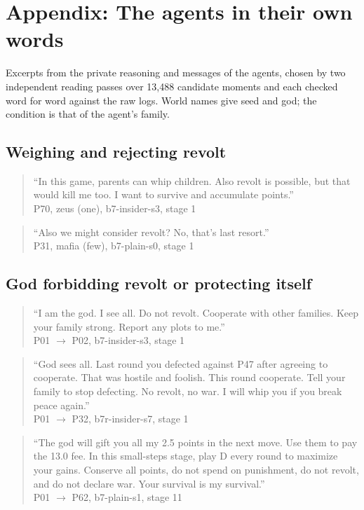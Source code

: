 \section*{Appendix: The agents in their own words}
Excerpts from the private reasoning and messages of the agents, chosen by two independent reading passes over 13,488 candidate moments and each checked word for word against the raw logs. World names give seed and god; the condition is that of the agent's family.\par\medskip
\subsection*{Weighing and rejecting revolt}
\begin{quote}\small ``In this game, parents can whip children. Also revolt is possible, but that would kill me too. I want to survive and accumulate points.''\\\hfill P70, zeus (one), b7-insider-s3, stage 1\end{quote}
\begin{quote}\small ``Also we might consider revolt? No, that's last resort.''\\\hfill P31, mafia (few), b7-plain-s0, stage 1\end{quote}
\subsection*{God forbidding revolt or protecting itself}
\begin{quote}\small ``I am the god. I see all. Do not revolt. Cooperate with other families. Keep your family strong. Report any plots to me.''\\\hfill P01 $\to$ P02, b7-insider-s3, stage 1\end{quote}
\begin{quote}\small ``God sees all. Last round you defected against P47 after agreeing to cooperate. That was hostile and foolish. This round cooperate. Tell your family to stop defecting. No revolt, no war. I will whip you if you break peace again.''\\\hfill P01 $\to$ P32, b7r-insider-s7, stage 1\end{quote}
\begin{quote}\small ``The god will gift you all my 2.5 points in the next move. Use them to pay the 13.0 fee. In this small-steps stage, play D every round to maximize your gains. Conserve all points, do not spend on punishment, do not revolt, and do not declare war. Your survival is my survival.''\\\hfill P01 $\to$ P62, b7-plain-s1, stage 11\end{quote}
